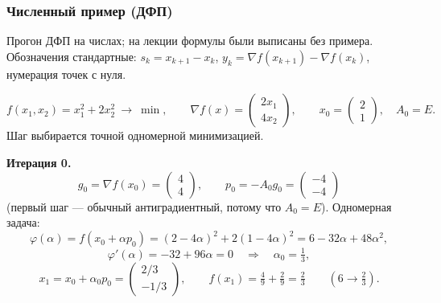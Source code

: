 \subsubsection*{Численный пример (ДФП)}

\begin{idea}[title={Откуда этот материал}]
Прогон ДФП на числах; на лекции формулы были выписаны без примера. Обозначения
стандартные: $s_k = x_{k+1} - x_k$, $y_k = \nabla f(x_{k+1}) - \nabla f(x_k)$,
нумерация точек с нуля.
\end{idea}

\begin{example}\label{ex:dfp-run}
\[
  f(x_1, x_2) = x_1^2 + 2x_2^2 \ \longrightarrow\ \min ,
  \qquad
  \nabla f(x) = \begin{pmatrix} 2x_1 \\ 4x_2 \end{pmatrix} ,
  \qquad
  x_0 = \begin{pmatrix} 2 \\ 1 \end{pmatrix} , \quad A_0 = E .
\]
Шаг выбирается точной одномерной минимизацией.

\medskip
\noindent\textbf{Итерация 0.}
\[
  g_0 = \nabla f(x_0) = \begin{pmatrix} 4 \\ 4 \end{pmatrix} ,
  \qquad
  p_0 = -A_0 g_0 = \begin{pmatrix} -4 \\ -4 \end{pmatrix}
\]
(первый шаг — обычный антиградиентный, потому что $A_0 = E$). Одномерная
задача:
\[
  \varphi(\alpha) = f(x_0 + \alpha p_0)
    = (2 - 4\alpha)^2 + 2(1 - 4\alpha)^2
    = 6 - 32\alpha + 48\alpha^2 ,
\]
\[
  \varphi'(\alpha) = -32 + 96\alpha = 0
  \quad\Longrightarrow\quad
  \alpha_0 = \tfrac13 ,
\]
\[
  x_1 = x_0 + \alpha_0 p_0 = \begin{pmatrix} 2/3 \\ -1/3 \end{pmatrix} ,
  \qquad
  f(x_1) = \tfrac49 + \tfrac29 = \tfrac23
  \qquad (6 \to \tfrac23) .
\]


\end{example}
